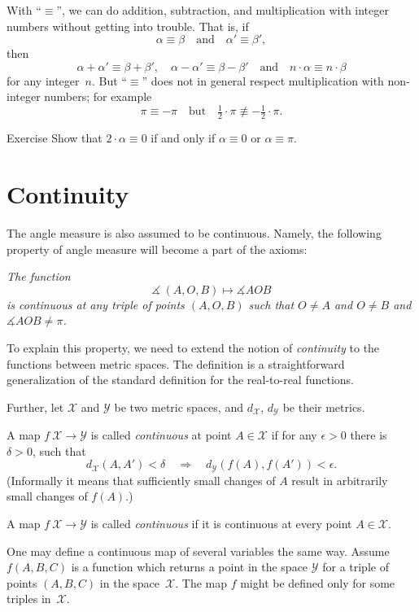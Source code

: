 With ``$\equiv$'', we can do addition, subtraction, and multiplication with integer numbers without getting into trouble.
That is, if
$$\alpha\equiv\beta
\quad
\text{and}
\quad
\alpha'\equiv \beta',$$ 
then
$$\alpha+\alpha'\equiv\beta+\beta',
\quad
\alpha-\alpha'\equiv \beta-\beta'
\quad 
\text{and}
\quad
n\cdot\alpha\equiv n\cdot\beta$$
for any integer~$n$.
But ``$\equiv$'' does not in general respect multiplication with non-integer numbers; for example 
$$\pi
\equiv 
-\pi
\quad
\text{but}
\quad
\tfrac12\cdot\pi
\not\equiv
-\tfrac12\cdot\pi.$$ 

\begin{thm}{Exercise}\label{ex:2a=0}
Show that $2\cdot\alpha\equiv0$ if and only if $\alpha\equiv0$ or $\alpha\equiv\pi$.
\end{thm}

\section*{Continuity}

The angle measure is also assumed to be continuous.
Namely, the following property of angle measure will become a part of the axioms:

\textit{The function}
$$\measuredangle\:(A,O,B)\mapsto\measuredangle A O B$$
\textit{is continuous at any triple of points $(A,O,B)$
such that $O\ne A$ and $O\ne B$ and $\measuredangle A O B\ne\pi$.}

To explain this property, we need to extend the notion of {}\emph{continuity} to the functions between metric spaces.
The definition is a straightforward generalization of the standard definition for the real-to-real functions.

Further, let $\mathcal X$ and $\mathcal Y$ be two metric spaces,
and $d_{\mathcal X}$, $d_{\mathcal Y}$ be their metrics.

A map $f\:\mathcal X\to\mathcal Y$ is called \emph{continuous} at point $A\in \mathcal X$
if for any $\epsilon>0$ there is $\delta>0$, such that 
\[d_{\mathcal X}(A,A')
<
\delta
\quad
\Rightarrow
\quad
d_{\mathcal Y}(f(A),f(A'))
<
\epsilon.\]
(Informally it means that sufficiently small changes of $A$ result in arbitrarily small changes of $f(A)$.)

A map $f\:\mathcal X\to\mathcal Y$ is called \emph{continuous} if it is continuous at every point $A\in \mathcal X$.

One may define a continuous map of several variables the same way.
Assume $f(A,B,C)$ is a function which returns a point in the space $\mathcal Y$ for a triple of points $(A,B,C)$
in the space~$\mathcal X$.
The map $f$ might be defined only for some triples in~$\mathcal X$.

